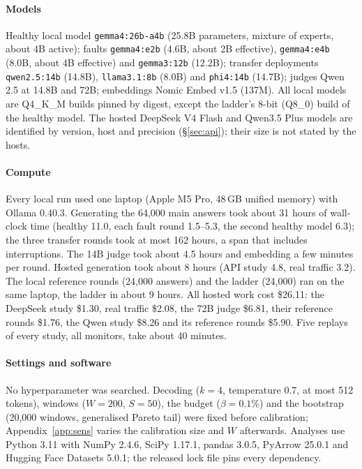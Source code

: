 \documentclass[11pt]{article}
\begin{document}
\paragraph{Models} Healthy local model \texttt{gemma4:26b-a4b} (25.8B parameters,
mixture of experts, about 4B active); faults \texttt{gemma4:e2b} (4.6B, about 2B
effective), \texttt{gemma4:e4b} (8.0B, about 4B effective) and \texttt{gemma3:12b}
(12.2B); transfer deployments \texttt{qwen2.5:14b} (14.8B), \texttt{llama3.1:8b}
(8.0B) and \texttt{phi4:14b} (14.7B); judges Qwen 2.5 at 14.8B and 72B; embeddings
Nomic Embed v1.5 (137M). All local models are Q4\_K\_M builds pinned by digest,
except the ladder's 8-bit (Q8\_0) build of the healthy model. The hosted DeepSeek V4
Flash and Qwen3.5 Plus models are identified by version, host and precision
(\S\ref{sec:api}); their size is not stated by the hosts.

\paragraph{Compute} Every local run used one laptop (Apple M5 Pro, 48\,GB unified
memory) with Ollama 0.40.3. Generating the 64{,}000 main answers took about 31
hours of wall-clock time (healthy 11.0, each fault round 1.5--5.3, the second
healthy model 6.3); the three transfer rounds took at most 162 hours, a span that
includes interruptions. The 14B judge took about 4.5 hours and embedding a few
minutes per round. Hosted generation took about 8 hours (API study 4.8, real
traffic 3.2). The local reference rounds (24{,}000 answers) and the ladder (24{,}000)
ran on the same laptop, the ladder in about 9 hours. All hosted work cost \$26.11:
the DeepSeek study \$1.30, real traffic \$2.08, the 72B judge \$6.81, their
reference rounds \$1.76, the Qwen study \$8.26 and its reference rounds \$5.90.
Five replays of every study, all monitors, take about 40 minutes.

\paragraph{Settings and software} No hyperparameter was searched. Decoding ($k=4$,
temperature 0.7, at most 512 tokens), windows ($W=200$, $S=50$), the budget
($\beta=0.1\%$) and the bootstrap (20{,}000 windows, generalised Pareto tail) were
fixed before calibration; Appendix~\ref{app:sens} varies the calibration size and
$W$ afterwards. Analyses use Python 3.11 with NumPy 2.4.6, SciPy 1.17.1, pandas
3.0.5, PyArrow 25.0.1 and Hugging Face Datasets 5.0.1; the released lock file pins
every dependency.
\end{document}
